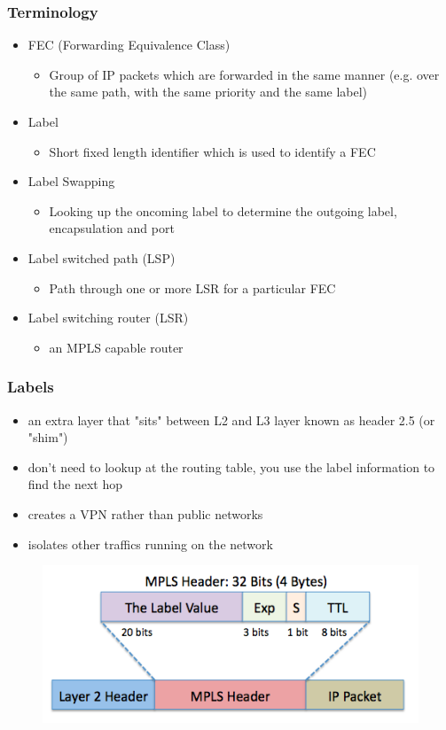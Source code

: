 \documentclass[12pt]{beamer}
\begin{document}
\begin{frame}
	\frametitle{Terminology}
	\begin{itemize}
		\item FEC (Forwarding Equivalence Class)
			\begin{itemize}
				\item Group of IP packets which are forwarded in the same manner (e.g. over the same path, with the same priority and the same label)
			\end{itemize}
		\item Label
			\begin{itemize}
				\item Short fixed length identifier which is used to identify a FEC
			\end{itemize}							
		\item Label Swapping
			\begin{itemize}
				\item Looking up the oncoming label to determine the outgoing label, encapsulation and port
			\end{itemize}
		\item Label switched path (LSP)
			\begin{itemize}
				\item Path through one or more LSR for a particular FEC
			\end{itemize}
		\item Label switching router (LSR)
			\begin{itemize}
				\item an MPLS capable router
			\end{itemize}
	\end{itemize}
\end{frame}

\begin{frame}
	\frametitle{Labels}
	\begin{itemize}
		\item an extra layer that "sits" between L2 and L3 layer
		known as header 2.5 (or "shim")
		\item don't need to lookup at the routing table, you use the label information
		to find the next hop
		\item creates a VPN rather than public networks
		\item isolates other traffics running on the network
	\end{itemize}
		\begin{figure}[h]
			\begin{center}
				\includegraphics[scale=0.40]{header_mpls.png}
			\end{center}
		\end{figure}	
\end{frame}
\end{document}
